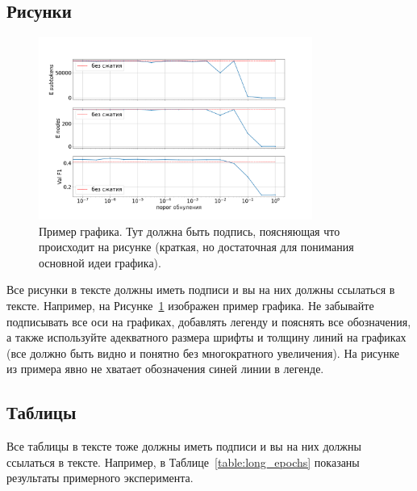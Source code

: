 \documentclass[a4paper,12pt]{extarticle}
\begin{document}
\subsection{Рисунки}

\begin{figure}[ht]
	\centering
	\includegraphics[width=0.8\textwidth]{example.png}
	\caption{Пример графика. Тут должна быть подпись, поясняющая что происходит на рисунке (краткая, но достаточная для понимания основной идеи графика).}
	\label{fig:by_epochs}
\end{figure}

Все рисунки в тексте должны иметь подписи и вы на них должны ссылаться в тексте. Например, на Рисунке~\ref{fig:by_epochs} изображен пример графика. Не забывайте подписывать все оси на графиках, добавлять легенду и пояснять все обозначения, а также используйте адекватного размера шрифты и толщину линий на графиках (все должно быть видно и понятно без многократного увеличения). На рисунке из примера явно не хватает обозначения синей линии в легенде.


\subsection{Таблицы}

Все таблицы в тексте тоже должны иметь подписи и вы на них должны ссылаться в тексте. Например, в Таблице~\ref{table:long_epochs} показаны результаты примерного эксперимента. 
\end{document}
